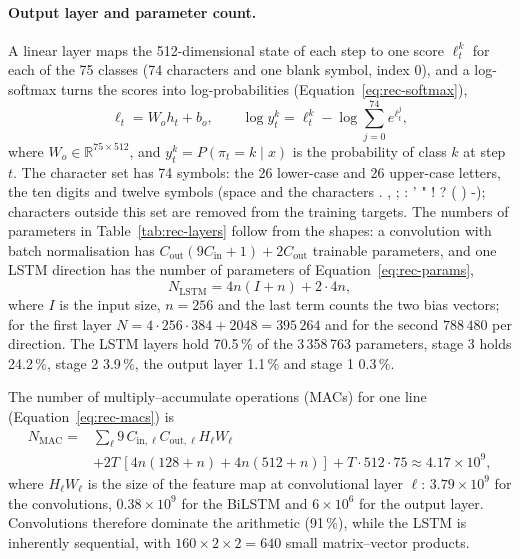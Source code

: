 \paragraph{Output layer and parameter count.}
A linear layer maps the 512-dimensional state of each step to one score $\ell_t^k$ for each of the 75 classes (74 characters and one blank symbol, index 0), and a log-softmax turns the scores into log-probabilities (Equation~\ref{eq:rec-softmax}),
\begin{equation}
\ell_t=W_oh_t+b_o,\qquad \log y_t^k=\ell_t^k-\log\sum_{j=0}^{74}e^{\ell_t^j},
\label{eq:rec-softmax}
\end{equation}
where $W_o\in\mathbb R^{75\times512}$, and $y_t^k=P(\pi_t=k\mid x)$ is the probability of class $k$ at step $t$.
The character set has 74 symbols: the 26 lower-case and 26 upper-case letters, the ten digits and twelve symbols (space and the characters . , ; : ' " ! ? ( ) -); characters outside this set are removed from the training targets.
The numbers of parameters in Table~\ref{tab:rec-layers} follow from the shapes: a convolution with batch normalisation has $C_{\mathrm{out}}(9C_{\mathrm{in}}+1)+2C_{\mathrm{out}}$ trainable parameters, and one LSTM direction has the number of parameters of Equation~\ref{eq:rec-params},
\begin{equation}
N_{\mathrm{LSTM}}=4n(I+n)+2\cdot4n,
\label{eq:rec-params}
\end{equation}
where $I$ is the input size, $n=256$ and the last term counts the two bias vectors; for the first layer $N=4\cdot256\cdot384+2048=395\,264$ and for the second $788\,480$ per direction.
The LSTM layers hold 70.5\,\% of the 3\,358\,763 parameters, stage 3 holds 24.2\,\%, stage 2 3.9\,\%, the output layer 1.1\,\% and stage 1 0.3\,\%.

The number of multiply--accumulate operations (MACs) for one line (Equation~\ref{eq:rec-macs}) is
\begin{equation}
\begin{split}N_{\mathrm{MAC}}={}&\sum_\ell 9\,C_{\mathrm{in},\ell}C_{\mathrm{out},\ell}H_\ell W_\ell\\&+2T\,[4n(128+n)+4n(512+n)]+T\cdot512\cdot75\approx4.17\times10^9,\end{split}
\label{eq:rec-macs}
\end{equation}
where $H_\ell W_\ell$ is the size of the feature map at convolutional layer $\ell$: $3.79\times10^9$ for the convolutions, $0.38\times10^9$ for the BiLSTM and $6\times10^6$ for the output layer.
Convolutions therefore dominate the arithmetic (91\,\%), while the LSTM is inherently sequential, with $160\times2\times2=640$ small matrix--vector products.

